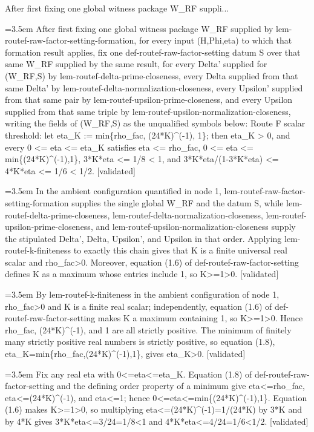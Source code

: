 \documentclass{article}
\newcommand{\step}[1]{\par\noindent\hangindent=3.5em\hangafter=1%
  \makebox[3.5em][l]{\textbf{#1.}}}
\newcommand{\steptag}[1]{\hfill{\small\textsf{[#1]}}}
\begin{document}
\begin{proofbox}{After first fixing one global witness package W\_RF suppli...}
\step{1} After first fixing one global witness package W\_RF supplied by lem-routef-raw-factor-setting-formation, for every input (H,Phi,eta) to which that formation result applies, fix one def-routef-raw-factor-setting datum S over that same W\_RF supplied by the same result, for every Delta' supplied for (W\_RF,S) by lem-routef-delta-prime-closeness, every Delta supplied from that same Delta' by lem-routef-delta-normalization-closeness, every Upsilon' supplied from that same pair by lem-routef-upsilon-prime-closeness, and every Upsilon supplied from that same triple by lem-routef-upsilon-normalization-closeness, writing the fields of (W\_RF,S) as the unqualified symbols below: Route F scalar threshold: let eta\_K := min\{rho\_fac, (24*K)\textasciicircum{}(-1), 1\}; then eta\_K > 0, and every 0 <= eta <= eta\_K satisfies eta <= rho\_fac, 0 <= eta <= min\{(24*K)\textasciicircum{}(-1),1\}, 3*K*eta <= 1/8 < 1, and 3*K*eta/(1-3*K*eta) <= 4*K*eta <= 1/6 < 1/2. \steptag{validated} \\[6pt]
\step{1.1} In the ambient configuration quantified in node 1, lem-routef-raw-factor-setting-formation supplies the single global W\_RF and the datum S, while lem-routef-delta-prime-closeness, lem-routef-delta-normalization-closeness, lem-routef-upsilon-prime-closeness, and lem-routef-upsilon-normalization-closeness supply the stipulated Delta', Delta, Upsilon', and Upsilon in that order. Applying lem-routef-k-finiteness to exactly this chain gives that K is a finite universal real scalar and rho\_fac>0. Moreover, equation (1.6) of def-routef-raw-factor-setting defines K as a maximum whose entries include 1, so K>=1>0. \steptag{validated} \\[4pt]
\step{1.2} By lem-routef-k-finiteness in the ambient configuration of node 1, rho\_fac>0 and K is a finite real scalar; independently, equation (1.6) of def-routef-raw-factor-setting makes K a maximum containing 1, so K>=1>0. Hence rho\_fac, (24*K)\textasciicircum{}(-1), and 1 are all strictly positive. The minimum of finitely many strictly positive real numbers is strictly positive, so equation (1.8), eta\_K=min\{rho\_fac,(24*K)\textasciicircum{}(-1),1\}, gives eta\_K>0. \steptag{validated} \\[4pt]
\step{1.3} Fix any real eta with 0<=eta<=eta\_K. Equation (1.8) of def-routef-raw-factor-setting and the defining order property of a minimum give eta<=rho\_fac, eta<=(24*K)\textasciicircum{}(-1), and eta<=1; hence 0<=eta<=min\{(24*K)\textasciicircum{}(-1),1\}. Equation (1.6) makes K>=1>0, so multiplying eta<=(24*K)\textasciicircum{}(-1)=1/(24*K) by 3*K and by 4*K gives 3*K*eta<=3/24=1/8<1 and 4*K*eta<=4/24=1/6<1/2. \steptag{validated} \\[4pt]

\end{proofbox}
\end{document}
